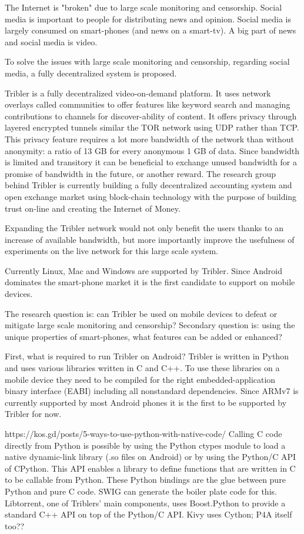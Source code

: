 The Internet is "broken" due to large scale monitoring and censorship.
Social media is important to people for distributing news and opinion.
Social media is largely consumed on smart-phones (and news on a smart-tv).
A big part of news and social media is video.

To solve the issues with large scale monitoring and censorship, regarding social media, a fully decentralized system is proposed.

Tribler is a fully decentralized video-on-demand platform.
It uses network overlays called communities to offer features like keyword search and managing contributions to channels for discover-ability of content.
It offers privacy through layered encrypted tunnels similar the TOR network using UDP rather than TCP.
This privacy feature requires a lot more bandwidth of the network than without anonymity: a ratio of 13 GB for every anonymous 1 GB of data.
Since bandwidth is limited and transitory it can be beneficial to exchange unused bandwidth for a promise of bandwidth in the future, or another reward.
The research group behind Tribler is currently building a fully decentralized accounting system and open exchange market using block-chain technology with the purpose of building trust on-line and creating the Internet of Money.

Expanding the Tribler network would not only benefit the users thanks to an increase of available bandwidth, but more importantly improve the usefulness of experiments on the live network for this large scale system.

Currently Linux, Mac and Windows are supported by Tribler. 
Since Android dominates the smart-phone market it is the first candidate to support on mobile devices.


The research question is: can Tribler be used on mobile devices to defeat or mitigate large scale monitoring and censorship?
Secondary question is: using the unique properties of smart-phones, what features can be added or enhanced?

First, what is required to run Tribler on Android?
Tribler is written in Python and uses various libraries written in C and C++.
To use these libraries on a mobile device they need to be compiled for the right embedded-application binary interface (EABI) including all nonstandard dependencies.
Since ARMv7 is currently supported by most Android phones it is the first to be supported by Tribler for now.


https://kos.gd/posts/5-ways-to-use-python-with-native-code/
Calling C code directly from Python is possible by using the Python ctypes module to load a native dynamic-link library (.so files on Android) or by using the Python/C API of CPython.
This API enables a library to define functions that are written in C to be callable from Python.
These Python bindings are the glue between pure Python and pure C code.
SWIG can generate the boiler plate code for this.
Libtorrent, one of Triblers' main components, uses Boost.Python to provide a standard C++ API on top of the Python/C API.
Kivy uses Cython; P4A itself too??

